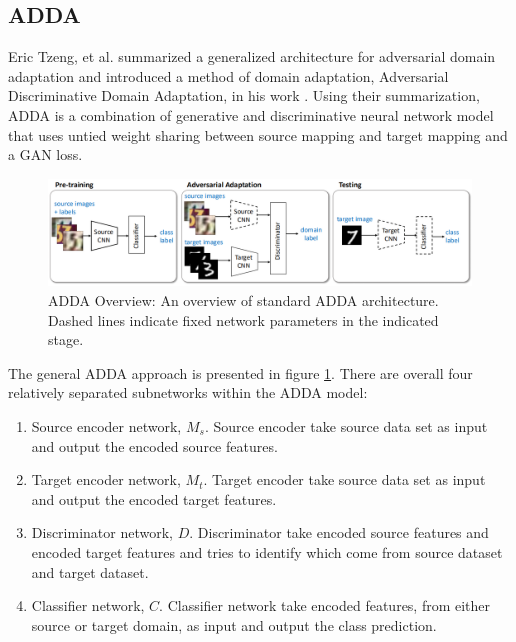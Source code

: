 \documentclass[conference]{IEEEtran}
\begin{document}
\subsection{ADDA}
Eric Tzeng, et al. summarized a generalized architecture for adversarial domain adaptation and introduced a method of domain adaptation, Adversarial Discriminative Domain Adaptation, in his work \cite{ADDA1}. Using their summarization, ADDA is a combination of generative and discriminative neural network model that uses untied weight sharing between source mapping and target mapping and a GAN loss.

\begin{figure}
  \centering
  \includegraphics[width=.75\textwidth]{LADDA_theorem1.jpg}
  \caption{ADDA Overview: An overview of standard ADDA architecture. Dashed lines indicate fixed network parameters in the indicated stage.}
  \label{ADDA_overview}
\end{figure}
The general ADDA approach is presented in figure \ref{ADDA_overview}. There are overall four relatively separated subnetworks within the ADDA model:
\begin{enumerate}
  \item Source encoder network, $M_s$. Source encoder take source data set as input and output the encoded source features.
  \item Target encoder network, $M_t$. Target encoder take source data set as input and output the encoded target features.
  \item Discriminator network, $D$. Discriminator take encoded source features and encoded target features and tries to identify which come from source dataset and target dataset.
  \item Classifier network, $C$. Classifier network take encoded features, from either source or target domain, as input and output the class prediction.
\end{enumerate}
\end{document}
